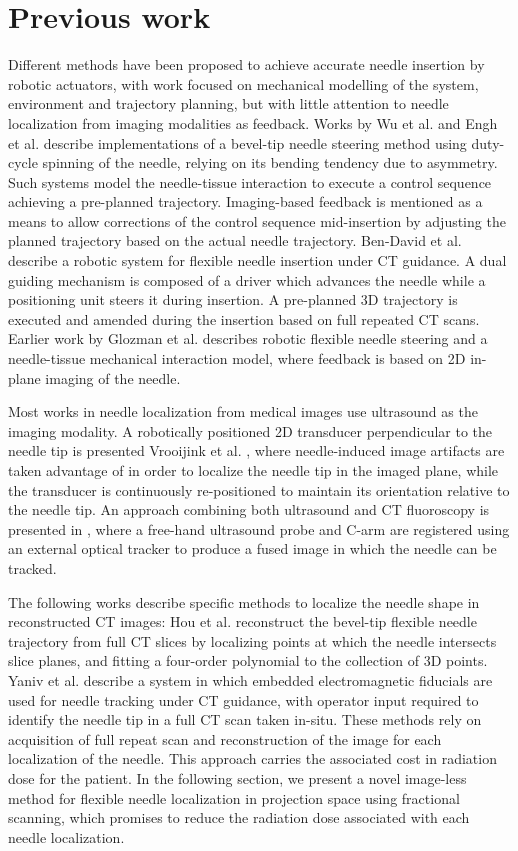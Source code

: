 \documentclass[letterpaper, 11 pt, conference]{ieeeconf} %
\begin{document}
\section{Previous work}
Different methods have been proposed to achieve accurate needle insertion by robotic actuators, with work focused on mechanical modelling of the system, environment and trajectory planning, but with little attention to needle localization from imaging modalities as feedback.
Works by Wu et al. \cite{wu2013automatic} and Engh et al. \cite{engh2010percutaneous} describe implementations of a bevel-tip needle steering method using duty-cycle spinning of the needle, relying on its bending tendency due to asymmetry. Such systems model the needle-tissue interaction to execute a control sequence achieving a pre-planned trajectory. Imaging-based feedback is mentioned as a means to allow corrections of the control sequence mid-insertion by adjusting the planned trajectory based on the actual needle trajectory.
Ben-David et al. \cite{ben2018robotic} describe a robotic system for flexible needle insertion under CT guidance. A dual guiding mechanism is composed of a driver which advances the needle while a positioning unit steers it during insertion. A pre-planned 3D trajectory is executed and amended during the insertion based on full repeated CT scans.
Earlier work by Glozman et al. \cite{glozman2007image} describes robotic flexible needle steering and a needle-tissue mechanical interaction model, where feedback is based on 2D in-plane imaging of the needle.

Most works in needle localization from medical images use ultrasound as the imaging modality. A robotically positioned 2D transducer perpendicular to the needle tip is presented Vrooijink et al. \cite{vrooijink2013real}, where needle-induced image artifacts are taken advantage of in order to localize the needle tip in the imaged plane, while the transducer is continuously re-positioned to maintain its orientation relative to the needle tip. An approach combining both ultrasound and CT fluoroscopy is presented in \cite{marinetto2017integration}, where a free-hand ultrasound probe and C-arm are registered using an external optical tracker to produce a fused image in which the needle can be tracked.

The following works describe specific methods to localize the needle shape in reconstructed CT images:
Hou et al. \cite{huo2015shape} reconstruct the bevel-tip flexible needle trajectory from full CT slices by localizing points at which the needle intersects slice planes, and fitting a four-order polynomial to the collection of 3D points.
Yaniv et al. \cite{yaniv2010needle} describe a system in which embedded electromagnetic fiducials are used for needle tracking under CT guidance, with operator input required to identify the needle tip in a full CT scan taken in-situ. These methods rely on acquisition of full repeat scan and reconstruction of the image for each localization of the needle. This approach carries the associated cost in radiation dose for the patient. In the following section, we present a novel image-less method for flexible needle localization in projection space using fractional scanning, which promises to reduce the radiation dose associated with each needle localization.
\end{document}
